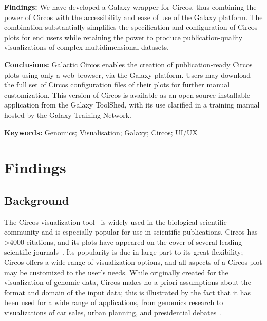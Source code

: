 \textbf{Findings:}
We have developed a Galaxy wrapper for Circos, thus combining the power of Circos with the accessibility and ease of use of the Galaxy platform. The combination substantially simplifies the specification and configuration of Circos plots for end users while retaining the power to produce publication-quality visualizations of complex multidimensional datasets.

\textbf{Conclusions:}
Galactic Circos enables the creation of publication-ready Circos plots using only a web browser, via the Galaxy platform. Users may download the full set of Circos configuration files of their plots for further manual customization. This version of Circos is available as an open-source installable application from the Galaxy ToolShed, with its use clarified in a training manual hosted by the Galaxy Training Network.

\textbf{Keywords: } Genomics; Visualisation; Galaxy; Circos; UI/UX


\section*{Findings}

\subsection*{Background}


The Circos visualization tool~\cite{krzywinski2009} is widely used in the biological scientific community and is especially popular for use in scientific publications. Circos has >4000 citations, and its plots have appeared on the cover of several leading scientific journals~\cite{circospubs}.  Its popularity is due in large part to its great flexibility; Circos offers a wide range of visualization options, and all aspects of a Circos plot may be customized to the user’s needs. While originally created for the visualization of genomic data, Circos makes no a priori assumptions about the format and domain of the input data; this is illustrated by the fact that it has been used for a wide range of applications, from genomics research to visualizations of car sales, urban planning, and presidential debates~\cite{circosnongenomic}.

